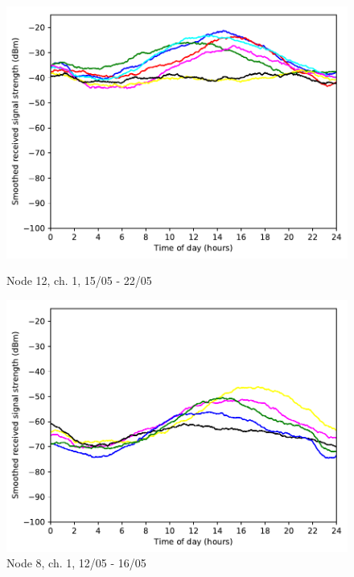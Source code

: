 \documentclass[a4paper, 11pt]{article}
\begin{document}
\begin{figure}[!h]
\begin{minipage}{0.47\textwidth}
    \centering
	\includegraphics[width=\textwidth]{images/2_4_GHz/cot-node12-student_2017-05-22_chan1_image}
    \caption{Node 12, ch. 1, 15/05 - 22/05} \label{node12-1}
\end{minipage}\hfill
\begin{minipage}{0.47\textwidth}
    \centering
	\includegraphics[width=\textwidth]{images/2_4_GHz/cot-node8-student_2017-05-16_chan1_image}
    \caption{Node 8, ch. 1, 12/05 - 16/05} \label{node8-1}
\end{minipage}\hfill
\end{figure}
\end{document}
